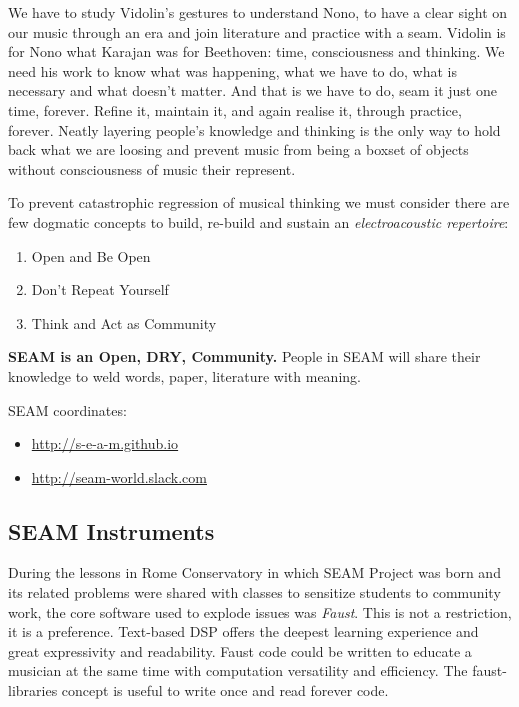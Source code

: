 \documentclass[twoside,a4paper]{article}
\begin{document}
We have to study Vidolin's gestures to understand Nono, to have a clear sight on our music through an era and join literature and practice with a seam. Vidolin is for Nono what Karajan was for Beethoven: time, consciousness and thinking. We need his work to know what was happening, what we have to do, what is necessary and what doesn't matter. And that is we have to do, seam it just one time, forever. Refine it, maintain it, and again realise it, through practice, forever. Neatly layering people's knowledge and thinking is the only way to hold back what we are loosing and prevent music from being a boxset of objects without consciousness of music their represent. 

To prevent catastrophic regression of musical thinking we must consider there are few dogmatic concepts to build, re-build and sustain an \emph{electroacoustic repertoire}:
\begin{enumerate}
  \item Open and Be Open
  \item Don't Repeat Yourself
  \item Think and Act as Community
\end{enumerate}

\textbf{SEAM is an Open, DRY, Community.} People in SEAM will share their knowledge to weld words, paper, literature with meaning.

SEAM coordinates: 
\begin{itemize}
\item \url{http://s-e-a-m.github.io}
\item \url{http://seam-world.slack.com}
\end{itemize}


\subsection{SEAM Instruments}

During the lessons in Rome Conservatory in which SEAM Project was born and its related problems were shared with classes to sensitize students to community work, the core software used to explode issues was \emph{Faust}. This is not a restriction, it is a preference. Text-based DSP offers the deepest learning experience and great expressivity and readability. Faust code could be written to educate a musician at the same time with computation versatility and efficiency. The faust-libraries concept is useful to write once and read forever code.  
\end{document}
